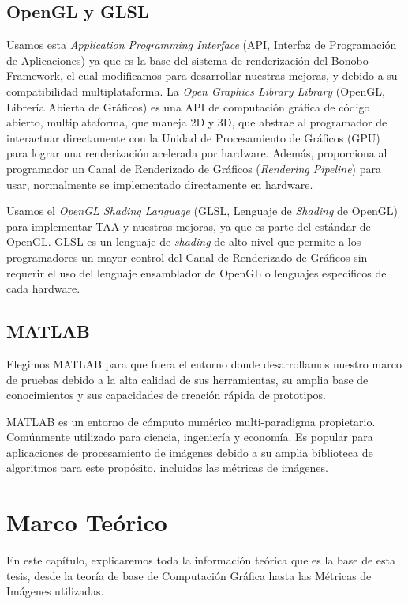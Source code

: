 \documentclass{cslthse-msc}
\begin{document}
\section{OpenGL y GLSL}
Usamos esta \textit{Application Programming Interface} (API, Interfaz de Programación de Aplicaciones) ya que es la base del sistema de renderización del Bonobo Framework, el cual modificamos para desarrollar nuestras mejoras, y debido a su compatibilidad multiplataforma. La \textit{Open Graphics Library Library} (OpenGL, Librería Abierta de Gráficos) es una API de computación gráfica de código abierto, multiplataforma, que maneja 2D y 3D, que abstrae al programador de interactuar directamente con la Unidad de Procesamiento de Gráficos (GPU) para lograr una renderización acelerada por hardware. Además, proporciona al programador un Canal de Renderizado de Gráficos (\textit{Rendering Pipeline}) para usar, normalmente se implementado directamente en hardware.

Usamos el \textit{OpenGL Shading Language} (GLSL, Lenguaje de \textit{Shading} de OpenGL) para implementar TAA y nuestras mejoras, ya que es parte del estándar de OpenGL. GLSL es un lenguaje de \textit{shading} de alto nivel que permite a los programadores un mayor control del Canal de Renderizado de Gráficos sin requerir el uso del lenguaje ensamblador de OpenGL o lenguajes específicos de cada hardware.


\section{MATLAB}
Elegimos MATLAB para que fuera el entorno donde desarrollamos nuestro marco de pruebas debido a la alta calidad de sus herramientas, su amplia base de conocimientos y sus capacidades de creación rápida de prototipos.

MATLAB es un entorno de cómputo numérico multi-paradigma propietario. Comúnmente utilizado para ciencia, ingeniería y economía. Es popular para aplicaciones de procesamiento de imágenes debido a su amplia biblioteca de algoritmos para este propósito, incluidas las métricas de imágenes.



\chapter{Marco Teórico}
En este capítulo, explicaremos toda la información teórica que es la base de esta tesis, desde la teoría de base de Computación Gráfica hasta las Métricas de Imágenes utilizadas.
\end{document}
